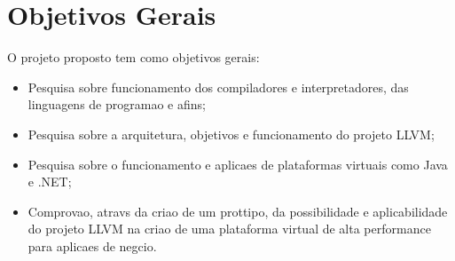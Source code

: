 \section{Objetivos Gerais}

\label{pro:objetivos_gerais}

O projeto proposto tem como objetivos gerais:
\begin{itemize}
  \item Pesquisa sobre funcionamento dos compiladores e interpretadores, das linguagens de programa\ca o e afins;
  \item Pesquisa sobre a arquitetura, objetivos e funcionamento do projeto LLVM;
  \item Pesquisa sobre o funcionamento e aplica\co es de plataformas virtuais como Java e .NET;
  \item Comprova\ca o, atrav\eh s da cria\ca o de um prot\oh tipo, da possibilidade e aplicabilidade do projeto LLVM na cria\ca o de uma plataforma virtual de alta performance para aplica\co es de neg\oh cio.
\end{itemize}
